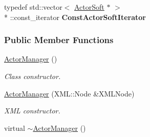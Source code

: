 \begin{DoxyCompactItemize}
\item 
\hypertarget{classMezzanine_1_1ActorManager_abe3c0c6a2cf63cd6795d7bd61b68acc0}{typedef std\-::vector$<$ \hyperlink{classMezzanine_1_1ActorSoft}{Actor\-Soft} $\ast$ $>$\\*
\-::const\-\_\-iterator {\bfseries Const\-Actor\-Soft\-Iterator}}\label{classMezzanine_1_1ActorManager_abe3c0c6a2cf63cd6795d7bd61b68acc0}

\end{DoxyCompactItemize}
\subsubsection*{Public Member Functions}
\begin{DoxyCompactItemize}
\item 
\hypertarget{classMezzanine_1_1ActorManager_aa9074e3c8dd87865e957c4d76fbc5e25}{\hyperlink{classMezzanine_1_1ActorManager_aa9074e3c8dd87865e957c4d76fbc5e25}{Actor\-Manager} ()}\label{classMezzanine_1_1ActorManager_aa9074e3c8dd87865e957c4d76fbc5e25}

\begin{DoxyCompactList}\small\item\em Class constructor. \end{DoxyCompactList}\item 
\hyperlink{classMezzanine_1_1ActorManager_af01011777296ba4f2768b6d41500923d}{Actor\-Manager} (X\-M\-L\-::\-Node \&X\-M\-L\-Node)
\begin{DoxyCompactList}\small\item\em X\-M\-L constructor. \end{DoxyCompactList}\item 
\hypertarget{classMezzanine_1_1ActorManager_acb09f9f1b4766dd2ca9e645bb505ac2f}{virtual \hyperlink{classMezzanine_1_1ActorManager_acb09f9f1b4766dd2ca9e645bb505ac2f}{$\sim$\-Actor\-Manager} ()}\label{classMezzanine_1_1ActorManager_acb09f9f1b4766dd2ca9e645bb505ac2f}


\end{DoxyCompactItemize}
